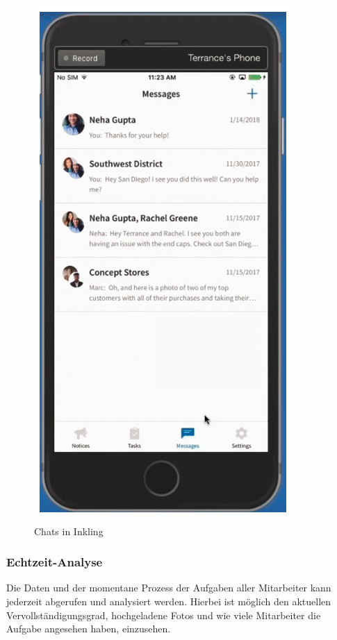 \begin{figure}[H] 
\centering 
\includegraphics[scale=0.72]{images/inkmsg} 
\caption[Chats in Inkling]{Chats in Inkling\protect} 
\label{ws} 
\end{figure}


\subsubsection{Echtzeit-Analyse}

Die Daten und der momentane Prozess der Aufgaben aller Mitarbeiter kann jederzeit abgerufen und analysiert werden. Hierbei ist möglich den aktuellen Vervollständigungsgrad, hochgeladene Fotos und wie viele Mitarbeiter die Aufgabe angesehen haben, einzusehen. 

